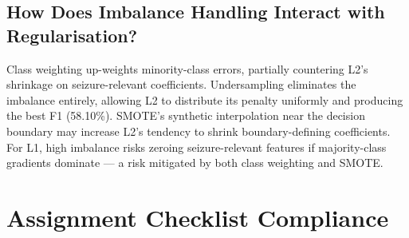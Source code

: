 \documentclass[conference]{IEEEtran}
\begin{document}
\subsection{How Does Imbalance Handling Interact with Regularisation?}

Class weighting up-weights minority-class errors, partially countering
L2's shrinkage on seizure-relevant coefficients. Undersampling eliminates
the imbalance entirely, allowing L2 to distribute its penalty uniformly
and producing the best F1 (58.10\%). SMOTE's synthetic interpolation
near the decision boundary may increase L2's tendency to shrink
boundary-defining coefficients. For L1, high imbalance risks zeroing
seizure-relevant features if majority-class gradients dominate --- a risk
mitigated by both class weighting and SMOTE.

\section{Assignment Checklist Compliance}
\label{sec:checklist}
\end{document}
